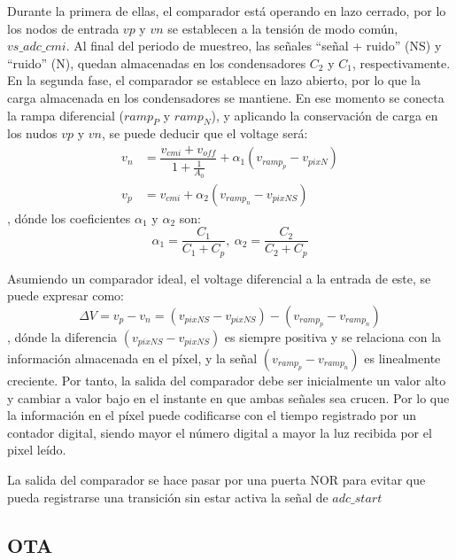 Durante la primera de ellas, el comparador está operando en lazo cerrado, por lo
los nodos de entrada $vp$ y $vn$ se establecen a la tensión de modo
común, $vs\_adc\_cmi$. Al final del periodo de muestreo, las señales
``señal + ruido'' (NS) y ``ruido'' (N), quedan almacenadas en los condensadores $C_2$
y $C_1$, respectivamente.\\

En la segunda fase, el comparador se establece en lazo abierto, por lo que la carga
almacenada en los condensadores se mantiene. En ese momento se conecta la
rampa diferencial ($ramp_P$ y $ramp_N$), y aplicando la conservación de carga en los
nudos $vp$ y $vn$, se puede deducir que el voltage será:\\

\begin{align}
	v_n &= \dfrac{v_{cmi} + v_{off}}{1+\frac{1}{A_0}} + \alpha_1 (v_{ramp_p}-v_{pixN})\\
	v_p &= v_{cmi} + \alpha_2 (v_{ramp_n}-v_{pixNS})
\end{align}
, dónde los coeficientes $\alpha_1$ y $\alpha_2$ son:\\

\begin{equation}
	\alpha_1 = \dfrac{C_1}{C_1+C_p},~
	\alpha_2 = \dfrac{C_2}{C_2+C_p}
\end{equation}

Asumiendo un comparador ideal, el voltage diferencial a la entrada de este, se
puede expresar como:\\

\begin{equation}
	\Delta V= v_p - v_n = (v_{pixNS}-v_{pixNS}) - (v_{ramp_p}-v_{ramp_n})
\end{equation}
, dónde la diferencia $(v_{pixNS}-v_{pixNS})$ es siempre positiva y se relaciona
con la información almacenada en el píxel, y la señal $(v_{ramp_p}-v_{ramp_n})$ es
linealmente creciente. Por tanto, la salida del comparador debe ser inicialmente
un valor alto y cambiar a valor bajo en el instante en que ambas señales sea crucen.
Por lo que la información en el píxel puede codificarse con el tiempo registrado
por un contador digital, siendo mayor el número digital a mayor la luz recibida
por el pixel leído.

La salida del comparador se hace pasar por una puerta NOR para evitar que pueda
registrarse una transición sin estar activa la señal de $adc\_start$\\

\subsection{OTA}\label{cap:ro_sch_ota}

